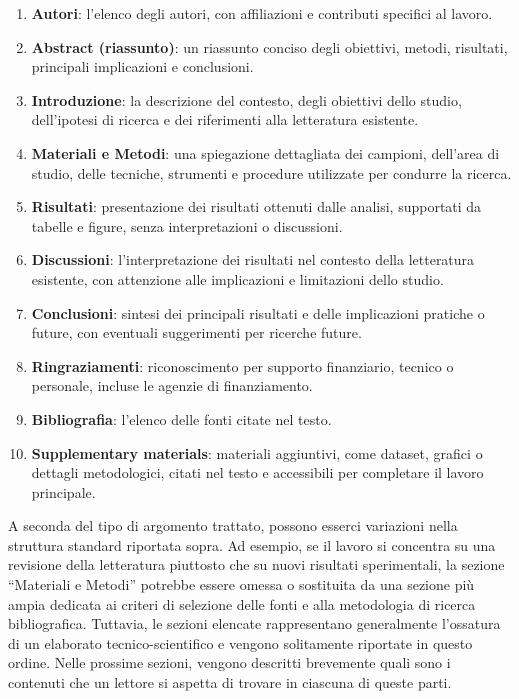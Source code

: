 \documentclass[9pt,a4paper,twoside]{rho-class/rho}
\begin{document}
\begin{enumerate}
\item \textbf{Autori}: l’elenco degli autori, con affiliazioni e contributi specifici al lavoro.
\item \textbf{Abstract (riassunto)}: un riassunto conciso degli obiettivi, metodi, risultati, principali implicazioni e conclusioni.
\item \textbf{Introduzione}: la descrizione del contesto, degli obiettivi dello studio, dell’ipotesi di ricerca e dei riferimenti alla letteratura esistente.
\item \textbf{Materiali e Metodi}: una spiegazione dettagliata dei campioni, dell'area di studio, delle tecniche, strumenti e procedure utilizzate per condurre la ricerca.
\item \textbf{Risultati}: presentazione dei risultati ottenuti dalle analisi, supportati da tabelle e figure, senza interpretazioni o discussioni.
\item \textbf{Discussioni}: l’interpretazione dei risultati nel contesto della letteratura esistente, con attenzione alle implicazioni e limitazioni dello studio.
\item \textbf{Conclusioni}: sintesi dei principali risultati e delle implicazioni pratiche o future, con eventuali suggerimenti per ricerche future.
\item \textbf{Ringraziamenti}: riconoscimento per supporto finanziario, tecnico o personale, incluse le agenzie di finanziamento.
\item \textbf{Bibliografia}: l’elenco delle fonti citate nel testo.
\item \textbf{Supplementary materials}: materiali aggiuntivi, come dataset, grafici o dettagli metodologici, citati nel testo e accessibili per completare il lavoro principale.
\end{enumerate}

A seconda del tipo di argomento trattato, possono esserci variazioni nella struttura standard riportata sopra. Ad esempio, se il lavoro si concentra su una revisione della letteratura piuttosto che su nuovi risultati sperimentali, la sezione “Materiali e Metodi” potrebbe essere omessa o sostituita da una sezione più ampia dedicata ai criteri di selezione delle fonti e alla metodologia di ricerca bibliografica. Tuttavia, le sezioni elencate rappresentano generalmente l’ossatura di un elaborato tecnico-scientifico e vengono solitamente riportate in questo ordine. Nelle prossime sezioni, vengono descritti brevemente quali sono i contenuti che un lettore si aspetta di trovare in ciascuna di queste parti.
\end{document}
